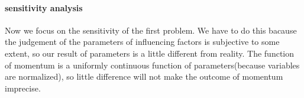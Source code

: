 \documentclass[12pt, a4paper, oneside]{article}
\theoremstyle{break}
\begin{document}
\paragraph{sensitivity analysis}
Now we focus on the sensitivity of the first problem. We have to do this bacause the judgement of the parameters of 
influencing factors is subjective to some extent, so our result of parameters is a little different from reality. 
The function of momentum is a uniformly continuous function of parameters(because variables are normalized), so little
difference will not make the outcome of momentum imprecise.
\end{document}
